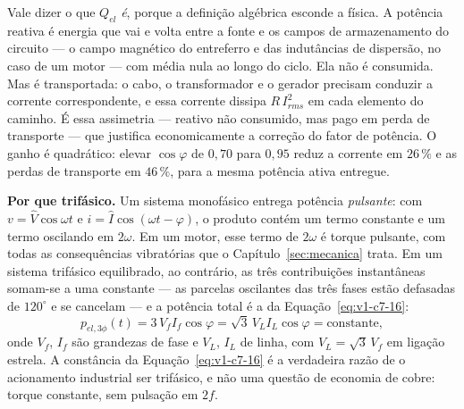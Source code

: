 \documentclass[12pt,a4paper]{article}
\numberwithin{equation}{section}
\numberwithin{table}{section}
\numberwithin{figure}{section}
\begin{document}
Vale dizer o que $Q_{el}$ \emph{é}, porque a definição algébrica esconde a
física. A potência reativa é energia que vai e volta entre a fonte e os campos
de armazenamento do circuito --- o campo magnético do entreferro e das
indutâncias de dispersão, no caso de um motor --- com média nula ao longo do
ciclo. Ela não é consumida. Mas é transportada: o cabo, o transformador e o
gerador precisam conduzir a corrente correspondente, e essa corrente dissipa
$R\,I_{rms}^2$ em cada elemento do caminho. É essa assimetria --- reativo não
consumido, mas pago em perda de transporte --- que justifica economicamente a
correção do fator de potência. O ganho é quadrático: elevar $\cos\varphi$ de
$0{,}70$ para $0{,}95$ reduz a corrente em $26\,\%$ e as perdas de transporte
em $46\,\%$, para a mesma potência ativa entregue.

\textbf{Por que trifásico.} Um sistema monofásico entrega potência
\emph{pulsante}: com $v = \hat{V}\cos\omega t$ e
$i = \hat{I}\cos(\omega t - \varphi)$, o produto contém um termo constante e um
termo oscilando em $2\omega$. Em um motor, esse termo de $2\omega$ é torque
pulsante, com todas as consequências vibratórias que o
Capítulo~\ref{sec:mecanica} trata. Em um sistema trifásico equilibrado, ao
contrário, as três contribuições instantâneas somam-se a uma constante --- as
parcelas oscilantes das três fases estão defasadas de $120^{\circ}$ e se
cancelam --- e a potência total é a da Equação~\eqref{eq:v1-c7-16}:
\begin{equation}\label{eq:v1-c7-16}
p_{el,3\phi}(t) = 3\,V_{f}I_{f}\cos\varphi = \sqrt{3}\,V_L I_L\cos\varphi
= \text{constante},
\end{equation}
onde $V_f$, $I_f$ são grandezas de fase e $V_L$, $I_L$ de linha, com
$V_L = \sqrt{3}\,V_f$ em ligação estrela. A constância da
Equação~\eqref{eq:v1-c7-16} é a verdadeira razão de o acionamento industrial
ser trifásico, e não uma questão de economia de cobre: torque constante, sem
pulsação em $2f$.
\end{document}
